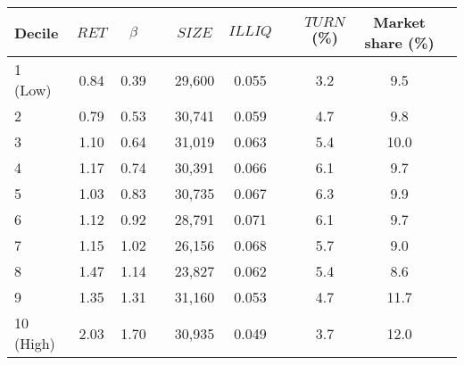 \begin{tabular}{@{}lccccccccc@{}}
	\toprule
	Decile & $\textit{RET}$ & $\beta$ && $\textit{SIZE}$ & $\textit{ILLIQ}$ && $\textit{TURN}$ (\%) & Market share (\%) \\ \midrule
1 (Low) & 0.84 & 0.39 && 29,600 & 0.055 && 3.2 & 9.5 \\
2       & 0.79 & 0.53 && 30,741 & 0.059 && 4.7 & 9.8 \\
3       & 1.10 & 0.64 && 31,019 & 0.063 && 5.4 & 10.0 \\
4       & 1.17 & 0.74 && 30,391 & 0.066 && 6.1 & 9.7 \\
5       & 1.03 & 0.83 && 30,735 & 0.067 && 6.3 & 9.9 \\
6       & 1.12 & 0.92 && 28,791 & 0.071 && 6.1 & 9.7 \\
7       & 1.15 & 1.02 && 26,156 & 0.068 && 5.7 & 9.0 \\
8       & 1.47 & 1.14 && 23,827 & 0.062 && 5.4 & 8.6 \\
9       & 1.35 & 1.31 && 31,160 & 0.053 && 4.7 & 11.7 \\
10 (High) & 2.03 & 1.70 && 30,935 & 0.049 && 3.7 & 12.0 \\
	\bottomrule
\end{tabular}